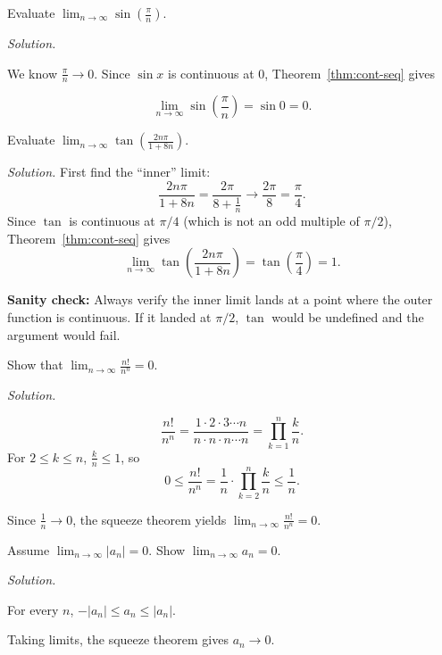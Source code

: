\begin{examplebox}[title={Worked Example: continuity trick}]

Evaluate $\displaystyle \lim_{n\to\infty}\sin\!\left(\frac{\pi}{n}\right)$.

\emph{Solution.}

We know $\frac{\pi}{n}\to 0$. Since $\sin x$ is continuous at $0$, Theorem~\ref{thm:cont-seq} gives

\[
\boxed{\lim_{n\to\infty}\sin\!\left(\frac{\pi}{n}\right)=\sin 0=0.}
\]

\end{examplebox}

\begin{examplebox}[title={Worked Example (Tutorial 7, Q2(viii)): continuity with $\tan$}]

Evaluate $\displaystyle \lim_{n\to\infty}\tan\!\left(\frac{2n\pi}{1+8n}\right)$.

\emph{Solution.}
First find the ``inner'' limit:
\[
\frac{2n\pi}{1+8n}=\frac{2\pi}{8+\frac{1}{n}}\to \frac{2\pi}{8}=\frac{\pi}{4}.
\]
Since $\tan$ is continuous at $\pi/4$ (which is not an odd multiple of $\pi/2$), Theorem~\ref{thm:cont-seq} gives
\[
\lim_{n\to\infty}\tan\!\left(\frac{2n\pi}{1+8n}\right)=\tan\!\left(\frac{\pi}{4}\right)=\boxed{1}.
\]

\textbf{Sanity check:} Always verify the inner limit lands at a point where the outer function is continuous. If it landed at $\pi/2$, $\tan$ would be undefined and the argument would fail.

\end{examplebox}

\begin{examplebox}[title={Worked Example: comparing growth rates}]

Show that $\displaystyle \lim_{n\to\infty}\frac{n!}{n^n}=0$.

\emph{Solution.}

\[
\frac{n!}{n^n}=\frac{1\cdot 2\cdot 3\cdots n}{n\cdot n\cdot n\cdots n}
=\prod_{k=1}^{n}\frac{k}{n}.
\]
For $2\le k\le n$, $\frac{k}{n}\le 1$, so
\[
0\le \frac{n!}{n^n}=\frac{1}{n}\cdot\prod_{k=2}^{n}\frac{k}{n}\le \frac{1}{n}.
\]

Since $\frac{1}{n}\to 0$, the squeeze theorem yields $\displaystyle \boxed{\lim_{n\to\infty}\frac{n!}{n^n}=0}$.

\end{examplebox}

\begin{examplebox}[title={Worked Example: if $|a_n|\to 0$ then $a_n\to 0$}]

Assume $\lim_{n\to\infty}|a_n|=0$. Show $\lim_{n\to\infty}a_n=0$.

\emph{Solution.}

For every $n$, $-|a_n|\le a_n\le |a_n|$.

Taking limits, the squeeze theorem gives $a_n\to 0$.

\end{examplebox}

